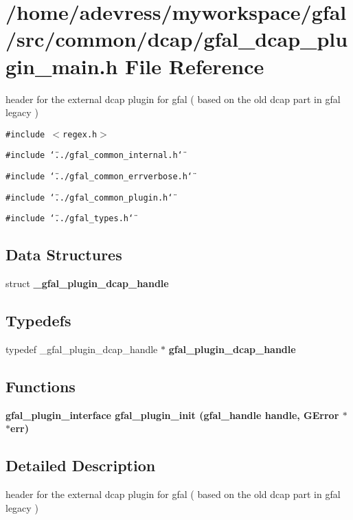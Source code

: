 \section{/home/adevress/myworkspace/gfal/src/common/dcap/gfal\_\-dcap\_\-plugin\_\-main.h File Reference}
\label{gfal__dcap__plugin__main_8h}
header for the external dcap plugin for gfal ( based on the old dcap part in gfal legacy ) 

{\tt \#include $<$regex.h$>$}\par
{\tt \#include \char`\"{}../gfal\_\-common\_\-internal.h\char`\"{}}\par
{\tt \#include \char`\"{}../gfal\_\-common\_\-errverbose.h\char`\"{}}\par
{\tt \#include \char`\"{}../gfal\_\-common\_\-plugin.h\char`\"{}}\par
{\tt \#include \char`\"{}../gfal\_\-types.h\char`\"{}}\par
\subsection*{Data Structures}
\begin{CompactItemize}
\item 
struct \textbf{\_\-gfal\_\-plugin\_\-dcap\_\-handle}
\end{CompactItemize}
\subsection*{Typedefs}
\begin{CompactItemize}
\item 
typedef \_\-gfal\_\-plugin\_\-dcap\_\-handle $\ast$ \textbf{gfal\_\-plugin\_\-dcap\_\-handle}\label{gfal__dcap__plugin__main_8h_74f42d292270fc09b8cf73c32ce80045}

\end{CompactItemize}
\subsection*{Functions}
\begin{CompactItemize}
\item 
\bf{gfal\_\-plugin\_\-interface} \bf{gfal\_\-plugin\_\-init} (gfal\_\-handle handle, GError $\ast$$\ast$err)
\end{CompactItemize}


\subsection{Detailed Description}
header for the external dcap plugin for gfal ( based on the old dcap part in gfal legacy ) 

